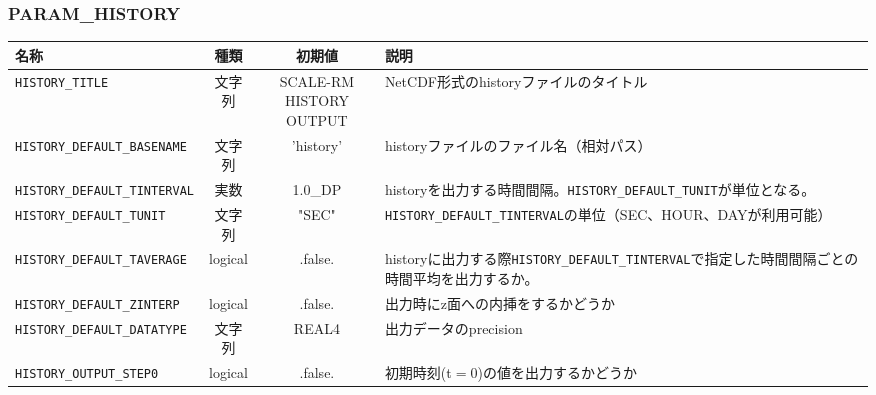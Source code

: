 \subsubsection{PARAM\_HISTORY}
\begin{tabularx}{150mm}{|l|c|c|X|} \hline
 \rowcolor[gray]{0.9} 名称 & 種類 & 初期値 & 説明 \\ \hline
 \verb|HISTORY_TITLE| & 文字列 & \shortstack{SCALE-RM \\ HISTORY OUTPUT} & NetCDF形式のhistoryファイルのタイトル \\ \hline
 \verb|HISTORY_DEFAULT_BASENAME| & 文字列 & 'history' & historyファイルのファイル名（相対パス） \\ \hline
 \verb|HISTORY_DEFAULT_TINTERVAL| & 実数 & 1.0\_DP & historyを出力する時間間隔。\verb|HISTORY_DEFAULT_TUNIT|が単位となる。 \\ \hline
 \verb|HISTORY_DEFAULT_TUNIT| & 文字列 & "SEC" & \verb|HISTORY_DEFAULT_TINTERVAL|の単位（SEC、HOUR、DAYが利用可能） \\ \hline
 \verb|HISTORY_DEFAULT_TAVERAGE| & logical & .false. & historyに出力する際\verb|HISTORY_DEFAULT_TINTERVAL|で指定した時間間隔ごとの時間平均を出力するか。 \\ \hline
 \verb|HISTORY_DEFAULT_ZINTERP| & logical & .false. & 出力時にz面への内挿をするかどうか \\ \hline
 \verb|HISTORY_DEFAULT_DATATYPE| & 文字列 & REAL4 & 出力データのprecision \\ \hline
 \verb|HISTORY_OUTPUT_STEP0| & logical & .false. & 初期時刻(t$=$0)の値を出力するかどうか \\ \hline
\end{tabularx}


